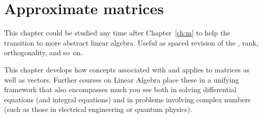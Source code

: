 
\chapter{Approximate matrices}
\label{ch:am}
\minitoc


\begin{aside}
This chapter could be studied any time after Chapter~\ref{ch:m} to help the transition to more abstract linear algebra.  
Useful as spaced revision of the \svd, rank, orthogonality, and so~on.
\end{aside}

This chapter develops how concepts associated with  and  applies to matrices as well as vectors.  
Further courses on Linear Algebra place these in a unifying framework that also encompasses much you see both in solving differential equations (and integral equations) and in problems involving complex numbers (such as those in electrical engineering or quantum physics). 



\begin{comment} 
Huge applications of \svd{}s to video compression, experimental errors, and other areas.
Introduce digital \idx{image compression} by \svd{}s \pooliv{p.607--8} \holti{p.336--7}  \cite[\S07]{Davis99a}.
\cite{Higham86} mentions applications of \idx{polar decomposition} to the Orthogonal Procrustes problem.
\end{comment}







\endinput

